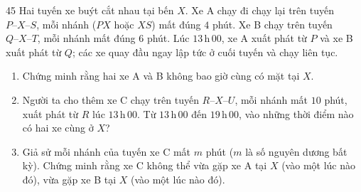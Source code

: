 \begin{probbox}{45}{}
Hai tuyến xe buýt cắt nhau tại bến $X$. Xe A chạy đi chạy lại trên tuyến $P\text{--}X\text{--}S$, mỗi nhánh ($PX$ hoặc $XS$) mất đúng $4$ phút. Xe B chạy trên tuyến $Q\text{--}X\text{--}T$, mỗi nhánh mất đúng $6$ phút. Lúc $13$\,h\,$00$, xe A xuất phát từ $P$ và xe B xuất phát từ $Q$; các xe quay đầu ngay lập tức ở cuối tuyến và chạy liên tục.
\begin{enumerate}[label=\alph*),leftmargin=1.6em,itemsep=1pt]
\item Chứng minh rằng hai xe A và B không bao giờ cùng có mặt tại $X$.
\item Người ta cho thêm xe C chạy trên tuyến $R\text{--}X\text{--}U$, mỗi nhánh mất $10$ phút, xuất phát từ $R$ lúc $13$\,h\,$00$. Từ $13$\,h\,$00$ đến $19$\,h\,$00$, vào những thời điểm nào có hai xe cùng ở $X$?
\item Giả sử mỗi nhánh của tuyến xe C mất $m$ phút ($m$ là số nguyên dương bất kỳ). Chứng minh rằng xe C không thể vừa gặp xe A tại $X$ (vào một lúc nào đó), vừa gặp xe B tại $X$ (vào một lúc nào đó).
\end{enumerate}
\end{probbox}
